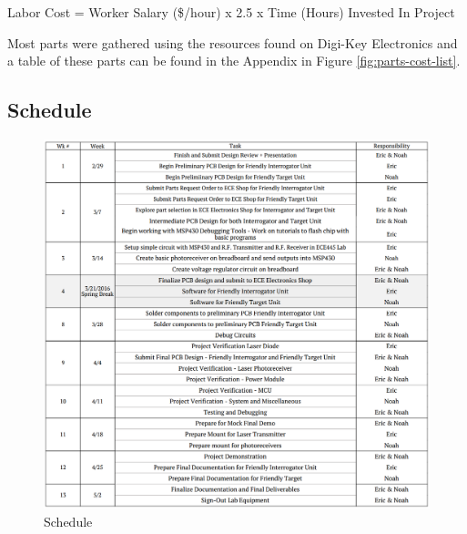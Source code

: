 \documentclass[letterpaper,10pt]{article}
\begin{document}
\begin{spacing}{1.15}
\begin{center}
	Labor Cost = Worker Salary (\$/hour) x 2.5 x Time (Hours) Invested In Project
\end{center}

Most parts were gathered using the resources found on Digi-Key Electronics and a table of these parts can be found in the Appendix in Figure \ref{fig:parts-cost-list}. \\

\subsection{Schedule}

\begin{figure} [H]
	\centering
	\includegraphics[scale=0.63]{Schedule_Extended.png}
	\caption{Schedule\label{fig:friendly-interrogator-software-flowchart}}
\end{figure}


\clearpage

\clearpage

\end{spacing}
\end{document}
